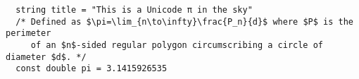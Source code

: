 \documentclass[utf8]{book}
\begin{document}
\tiny

\newenvironment{code}{\captionsetup{type=listing}}{}

\renewcommand{\theFancyVerbLine}{
  \sffamily\textcolor[rgb]{0.5,0.5,0.5}{\scriptsize\arabic{FancyVerbLine}}}

\begin{verbatim}
  string title = "This is a Unicode π in the sky"
  /* Defined as $\pi=\lim_{n\to\infty}\frac{P_n}{d}$ where $P$ is the perimeter
     of an $n$-sided regular polygon circumscribing a circle of diameter $d$. */
  const double pi = 3.1415926535
\end{verbatim}

\inputminted[frame=single]{cpp}{codigo/ficheroKEEL.h}

\end{document}
